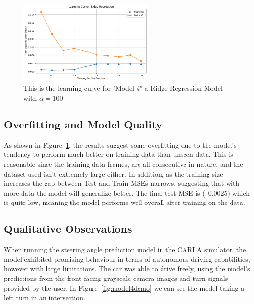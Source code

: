 \documentclass{article} %
\begin{document}
\begin{figure}[H] %
    \centering
    \includegraphics[width=0.6\textwidth]{model4learningcurve.png} %
    \caption{This is the learning curve for "Model 4" a Ridge Regression Model with $\alpha = 100$}
    \label{fig:model4learningcurve}
\end{figure}

\subsection{Overfitting and Model Quality}
As shown in Figure~\ref{fig:model4learningcurve}, the results suggest some overfitting due to the model's tendency
to perform much better on training data than unseen data. This is reasonable since the training data frames, 
are all consecutive in nature, and the dataset used isn't extremely large either. In addition, as the training size
increases the gap between Test and Train MSEs narrows, suggesting that with more data the model will generalize better. 
The final test MSE is (~0.0025) which is quite low, meaning the model performs well overall after training on the data.


\subsection{Qualitative Observations}
When running the steering angle prediction model in the CARLA simulator, the model exhibited promising behaviour in terms of
autonomous driving capabilities, however with large limitations. The car was able to drive freely, using the model's predictions
from the front-facing grayscale camera images and turn signals provided by the user. In Figure~\ref{fig:model4demo} we can see 
the model taking a left turn in an intersection.
\end{document}

